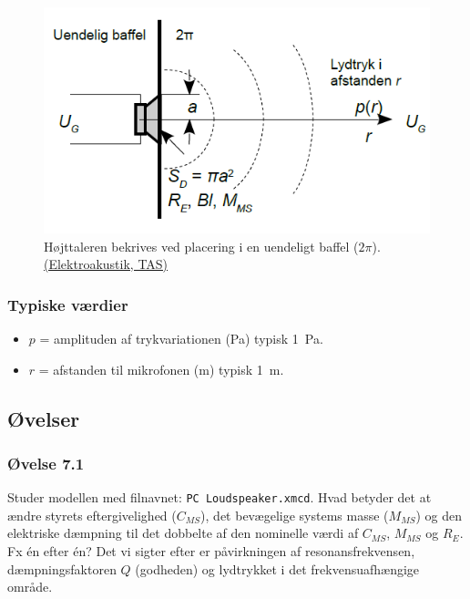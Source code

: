 \begin{figure} [H]
	\centering
	\includegraphics[width=0.7\linewidth]{graphics/29.png}
	\caption{Højttaleren bekrives ved placering i en uendeligt baffel ($2\pi$). \href{http://www.torean.dk/artikel/Elektroakustik.pdf}{(Elektroakustik, TAS)}}
	\label{fig:29}
\end{figure}

\subsubsection{Typiske værdier}
\begin{itemize}
	\item $p$ = amplituden af trykvariationen (\si{\pascal}) typisk \SI{1}{\pascal}.
	\item $r$ = afstanden til mikrofonen (\si{\meter}) typisk \SI{1}{\meter}.
\end{itemize}

\subsection{Øvelser}
\subsubsection{Øvelse 7.1}
Studer modellen med filnavnet: \texttt{PC Loudspeaker.xmcd}. Hvad betyder det at ændre styrets eftergivelighed ($C_{MS}$), det bevægelige systems masse ($M_{MS}$) og den elektriske dæmpning til det dobbelte af den nominelle værdi af $C_{MS}$, $M_{MS}$ og $R_E$. Fx én efter én? 
\newpage \noindent Det vi sigter efter er påvirkningen af resonansfrekvensen, dæmpningsfaktoren $Q$ (godheden) og lydtrykket i det frekvensuafhængige område.

